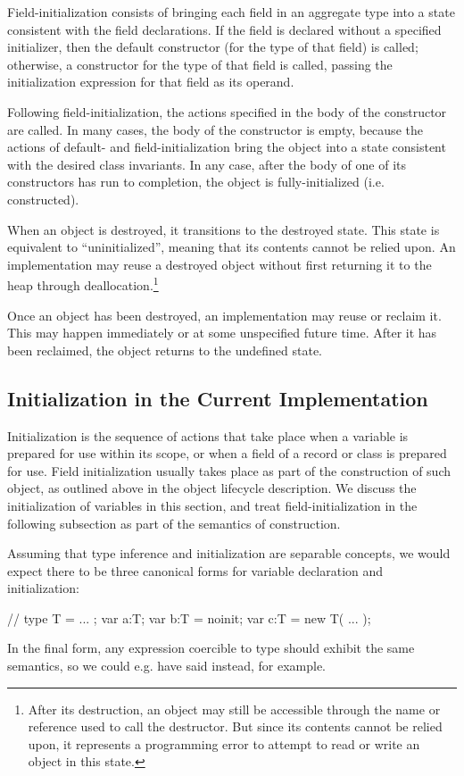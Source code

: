 Field-initialization consists of bringing each field in an aggregate type into a
state consistent with the field declarations.  If the field is declared without
a specified initializer, then the default constructor (for the type of that
field) is called; otherwise, a constructor for the type of that field is called,
passing the initialization expression for that field as its operand.

Following field-initialization, the actions specified in the body of the
constructor are called.  In many cases, the body of the constructor is empty,
because the actions of default- and field-initialization bring the object into a
state consistent with the desired class invariants.  In any case, after the body
of one of its constructors has run to completion, the object is
fully-initialized (i.e. constructed).

When an object is destroyed, it transitions to the destroyed state.  This state
is equivalent to ``uninitialized'', meaning that its contents cannot be relied
upon.  An implementation may reuse a destroyed object without first returning it
to the heap through deallocation.\footnote{After its destruction, an object may
  still be accessible through the name or reference used to call the
  destructor.  But since its contents cannot be relied upon, it represents a
  programming error to attempt to read or write an object in this state.}

Once an object has been destroyed, an implementation may reuse or reclaim it.
This may happen immediately or at some unspecified future time.  After it has
been reclaimed, the object returns to the undefined state.


\subsection{Initialization in the Current Implementation}

Initialization is the sequence of actions that take place when a variable is prepared for
use within its scope, or when a field of a record or class is prepared for use.  Field
initialization usually takes place as part of the construction of such object, as outlined
above in the object lifecycle description.  We discuss the initialization of variables in
this section, and treat field-initialization in the following subsection as part of the
semantics of construction. 

Assuming that type inference and initialization are separable concepts, we would expect
there to be three canonical forms for variable declaration and initialization:
\begin{chapel}
// type T = ... ;
   var a:T;
   var b:T = noinit;
   var c:T = new T( ... );
\end{chapel}
\noindent
In the final form, any expression coercible to type  should exhibit the same
semantics, so we could e.g. have said  instead, for example.

